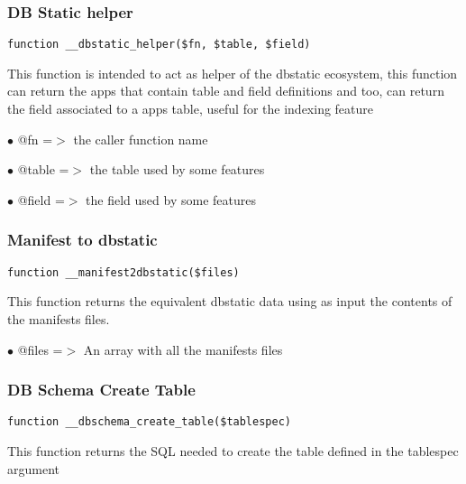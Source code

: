 \documentclass[a4paper]{article}
\begin{document}
\subsubsection{DB Static helper}

\begin{lstlisting}
function __dbstatic_helper($fn, $table, $field)
\end{lstlisting}

This function is intended to act as helper of the dbstatic ecosystem, this
function can return the apps that contain table and field definitions and
too, can return the field associated to a apps table, useful for the
indexing feature

\begin{compactitem}
\item[\color{myblue}$\bullet$] @fn    =$>$ the caller function name
\item[\color{myblue}$\bullet$] @table =$>$ the table used by some features
\item[\color{myblue}$\bullet$] @field =$>$ the field used by some features
\end{compactitem}

\hypertarget{toc429}{}
\subsubsection{Manifest to dbstatic}

\begin{lstlisting}
function __manifest2dbstatic($files)
\end{lstlisting}

This function returns the equivalent dbstatic data using as input the contents
of the manifests files.

\begin{compactitem}
\item[\color{myblue}$\bullet$] @files =$>$ An array with all the manifests files
\end{compactitem}

\hypertarget{toc430}{}
\subsubsection{DB Schema Create Table}

\begin{lstlisting}
function __dbschema_create_table($tablespec)
\end{lstlisting}

This function returns the SQL needed to create the table defined in the
tablespec argument
\end{document}

